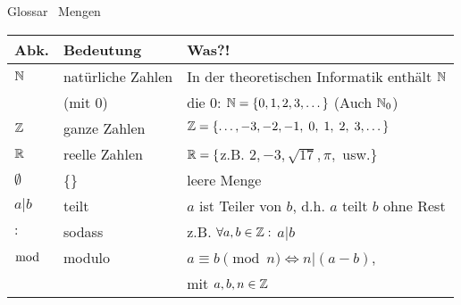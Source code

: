 %
%
%
%
\begin{frame}[fragile]{Glossar \textemdash\ Mengen}
    \small
    \begin{tabular}{p{} p{} p{}}
        \toprule
        Abk.        & Bedeutung         & Was?!                                                       \\
        \midrule
        $\mathbb{N}$ & natürliche Zahlen & In der theoretischen Informatik enthält $\mathbb{N}$         \\
                    & (mit $0$)         & die $0$: $\mathbb{N}=\{0,1,2,3,\dots\}$ (Auch $\mathbb{N}_0$) \\
        $\mathbb{Z}$ & ganze Zahlen      & $\mathbb{Z}=\{\dots,-3,-2,-1,\;0,\;1,\;2,\;3,\dots\}$        \\
        $\mathbb{R}$    & reelle Zahlen     & $\mathbb{R}=\{$z.B. $ 2,-3,\sqrt{17},\pi,$ usw.$\}$             \\
        $\emptyset$ & \{\}              & leere Menge                                                 \\
        $a|b$       & teilt             & $a$ ist Teiler von $b$, d.h. $a$ teilt $b$ ohne Rest        \\
        $:$         & sodass            & z.B. $\forall a,b\in\mathbb{Z}:$ $a|b$                       \\
        $\bmod$     & modulo            & $a\equiv b \pmod n \iff n|(a-b)$,                           \\
                    &                   & mit $a,b,n\in\mathbb{Z}$                                     \\
        \bottomrule
    \end{tabular}
\end{frame}